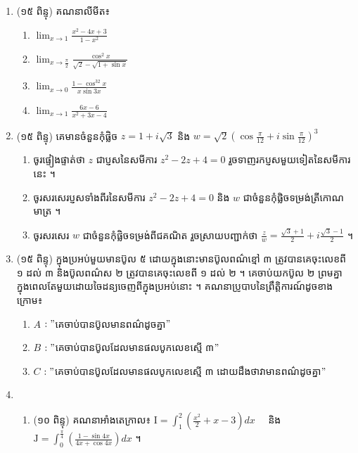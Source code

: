 \documentclass{officialexam}
\begin{document}
\newpage
	{\maketitle}
	\borderline{\bigg[ប្រធានទី០៤\bigg]}
	\begin{enumerate}[I]
		\item {\color{khtug}(១៥ ពិន្ទុ)} គណនាលីមីត៖
		\begin{enumerate}[k,4]
			\item $\lim_{x\to1}\frac{x^2-4x+3}{1-x^2}$
			\item $\lim_{x\to\frac{\pi}{2}}\frac{\cos^2x}{\sqrt{2}-\sqrt{1+\sin x}}$
			\item $\lim_{x\to0}\frac{1-\cos^32x}{x\sin3x}$
			\item $\lim_{x\to1}\frac{6x-6}{x^2+3x-4}$
		\end{enumerate}
		\item {\color{khtug}(១៥ ពិន្ទុ)} គេមានចំនួនកុំផ្លិច $z=1+i\sqrt{3}$ និង $w=\sqrt{2}\left(\cos\frac{\pi}{12}+i\sin\frac{\pi}{12}\right)^3$
		\begin{enumerate}[k]
			\item ចូរផ្ទៀងផ្ទាត់ថា $z$ ជាប្ញសនៃសមីការ $z^2-2z+4=0$ រួចទាញរកប្ញសមួយទៀតនៃសមីការនេះ ។
			\item ចូរសរសេរប្ញសទាំងពីរនៃសមីការ $z^2-2z+4=0$ និង $w$ ជាចំនួនកុំផ្លិចទម្រង់ត្រីកោណមាត្រ ។ 
			\item ចូរសរសេរ $w$ ជាចំនួនកុំផ្លិចទម្រង់ពីជគណិត រួចស្រាយបញ្ជាក់ថា $\frac{z}{w}=\frac{\sqrt{3}+1}{2}+i\frac{\sqrt{3}-1}{2}$ ។
		\end{enumerate}
		\item {\color{khtug}(១៥ ពិន្ទុ)} ក្នុងប្រអប់មួយមានប៊ូល ៥ ដោយក្នុងនោះមានប៊ូលពណ៌ខ្មៅ ៣ ត្រូវបានគេចុះលេខពី ១ ដល់ ៣ និងប៊ូលពណ៌ស ២ ត្រូវបានគេចុះលេខពី ១ ដល់ ២ ។ គេចាប់យកប៊ូល ២ ព្រមគ្នាក្នុងពេលតែមួយដោយចៃដន្យចេញពីក្នុងប្រអប់នោះ ។ គណនាប្រូបាបនៃព្រឹត្តិការណ៍ដូចខាងក្រោម៖ 
		\begin{enumerate}[k]
			\item $A$ $ :"$គេចាប់បានប៊ូលមានពណ៌ដូចគ្នា$"$
			\item $B$ $ :"$គេចាប់បានប៊ូលដែលមានផលបូកលេខស្មើ ៣$"$ 
			\item $C$ $ :"$គេចាប់បានប៊ូលដែលមានផលបូកលេខស្មើ ៣ ដោយដឹងថាវាមានពណ៌ដូចគ្នា$"$ 
		\end{enumerate}
		\item \begin{enumerate}[1]
			\item {\color{khtug}(១០ ពិន្ទុ)} គណនាអាំងតេក្រាល៖ $\mathrm{I}=\int_{1}^{2}\left(\frac{x^2}{2}+x-3\right)dx$ ~~និង $\mathrm{J}=\int_{0}^{\frac{\pi}{4}}\left(\frac{1-\sin4x}{4x+\cos4x}\right)dx$ ។

\end{enumerate}
\end{enumerate}
\end{document}
